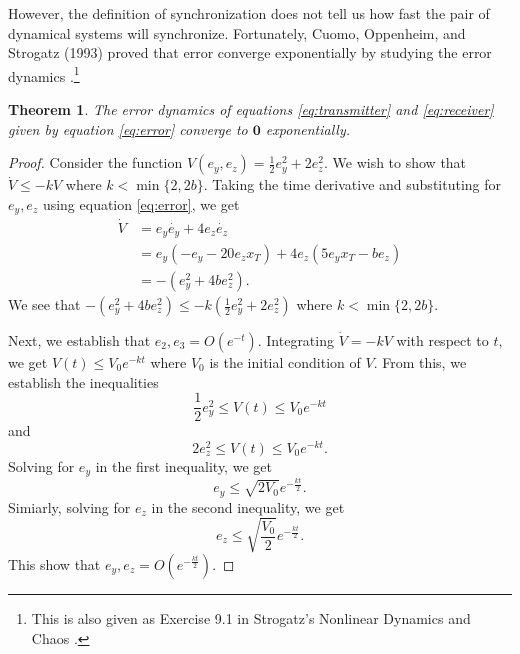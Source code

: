 \documentclass[12pt]{article}
\newtheorem{theorem}{Theorem}[section]
\begin{document}
      However, the definition of synchronization does not tell us how fast the pair of dynamical systems will synchronize. Fortunately, Cuomo, Oppenheim, and Strogatz (1993) proved that error converge exponentially by studying the error dynamics \cite{expProof}.\footnote{This is also given as Exercise 9.1 in Strogatz's Nonlinear Dynamics and Chaos \cite{strogatz2019nonlinear}.} 
      \begin{theorem}\label{thm:error}
        The error dynamics of equations \ref{eq:transmitter} and \ref{eq:receiver} given by equation \ref{eq:error} converge to $\mathbf{0}$ exponentially.
      \end{theorem}
      \begin{proof}
        Consider the function $V(e_y,e_z)=\frac{1}{2}e_y^2 + 2e_z^2$. We wish to show that $\dot{V} \leq - k V$ where $k<\min\{2,2b\}$. Taking the time derivative and substituting for $e_y,e_z$ using equation \ref{eq:error}, we get
        \begin{align*}
          \dot{V} &= e_y \dot{e_y} + 4e_z \dot{e_z} \\ 
          &= e_y (-e_y - 20e_z x_T) + 4e_z (5e_y x_T - be_z) \\
          &= - (e_y^2 + 4be_z^2). 
        \end{align*}
        We see that $- (e_y^2 + 4be_z^2) \leq -k \left( \frac{1}{2} e_y^2 + 2e_z^2 \right)$ where $k<\min\{2,2b\}$. 

        Next, we establish that $e_2,e_3 = O(e^{-t})$. Integrating $\dot{V} = -kV$ with respect to $t$, we get $V(t) \leq V_0 e^{-kt}$ where $V_0$ is the initial condition of $V$. From this, we establish the inequalities 
        \begin{equation*}
          \frac{1}{2}e_y^2 \leq V(t) \leq V_0 e^{-kt}
        \end{equation*}
        and 
        \begin{equation*}
          2e_z^2 \leq V(t) \leq V_0 e^{-kt}. 
        \end{equation*}
        Solving for $e_y$ in the first inequality, we get 
        \begin{equation*}
          e_y \leq \sqrt{2V_0} e^{-\frac{kt}{2}}. 
        \end{equation*}
        Simiarly, solving for $e_z$ in the second inequality, we get 
        \begin{equation*} 
          e_z \leq \sqrt{\frac{V_0}{2}} e^{-\frac{kt}{2}}. 
        \end{equation*}
        This show that $e_y,e_z = O(e^{-\frac{kt}{2}})$. 
        

\end{proof}
\end{document}

